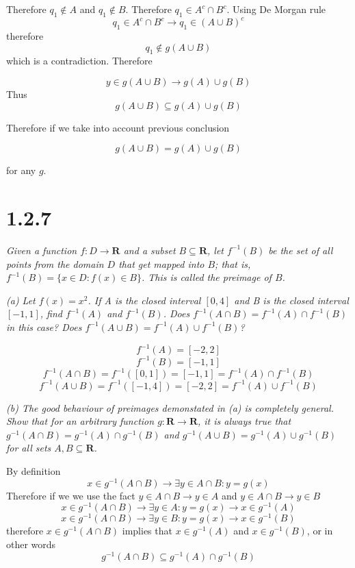\documentclass[11pt,oneside,titlepage]{book}
\begin{document}
Therefore $q_1 \notin A$ and $q_1 \notin B$. Therefore $q_1 \in A^c \cap B^c$.
Using De Morgan rule
$$q_1 \in A^c \cap B^c \to q_1 \in (A \cup B)^c$$
therefore 
$$q_1 \notin g(A \cup B)$$
which is a contradiction. Therefore

$$y \in g(A \cup B) \to g(A) \cup g(B)$$
Thus
$$g(A \cup B) \subseteq g(A) \cup g(B)$$

Therefore if we take into account previous conclusion

$$g(A \cup B) = g(A) \cup g(B)$$

for any $g$.

\section*{1.2.7}

\textit{Given a function $f: D \to \textbf{R}$ and a subset $B \subseteq \textbf{R}$, let $f^{-1}(B)$ be the set of all points from the domain $D$ that get mapped into $B$; that is, $f^{-1}(B) = \{x \in D: f(x) \in B\}$. This is called
  the preimage of $B$.}

\textit{(a) Let $f(x) = x^2$. If A is the closed interval $[0,4]$ and B is the
  closed interval $[-1, 1]$, find $f^{-1}(A)$ and $f^{-1}(B)$. Does
  $f^{-1}(A \cap B) = f^{-1}(A) \cap f^{-1}(B)$ in this case? Does
  $f^{-1}(A \cup B) = f^{-1}(A) \cup f^{-1}(B)$?
}

$$f^{-1}(A) = [-2, 2]$$
$$f^{-1}(B) = [-1, 1]$$
$$f^{-1}(A \cap B) = f^{-1}([0, 1]) = [-1, 1] = f^{-1}(A) \cap f^{-1}(B)$$
$$f^{-1}(A \cup B) = f^{-1}([-1, 4]) = [-2, 2] = f^{-1}(A) \cup f^{-1}(B)$$

\textit{(b) The good behaviour of preimages demonstated in (a) is completely
  general. Show that for an arbitrary function $g: \textbf{R} \to \textbf{R}$,
  it is always true that $g^{-1}(A \cap B) = g^{-1}(A) \cap g^{-1}(B)$ and
  $g^{-1}(A \cup B) = g^{-1}(A) \cup g^{-1}(B)$ for all sets $A, B \subseteq \textbf{R}$.
}

By definition
$$ x \in g^{-1}(A \cap B) \to \exists y \in A \cap B: y = g(x)$$
Therefore if we we use the fact  $y \in A \cap B \to y \in A$ and $y \in A \cap B \to y \in B$
$$ x \in g^{-1}(A \cap B) \to \exists y \in A: y = g(x) \to x \in g^{-1}(A)$$
$$ x \in g^{-1}(A \cap B) \to \exists y \in B: y = g(x) \to x \in g^{-1}(B)$$
therefore $x \in g^{-1}(A \cap B)$ implies that $x \in g^{-1}(A)$ and $x \in g^{-1}(B)$, or in other words
$$g^{-1}(A \cap B) \subseteq g^{-1}(A) \cap g^{-1}(B)$$
\end{document}
